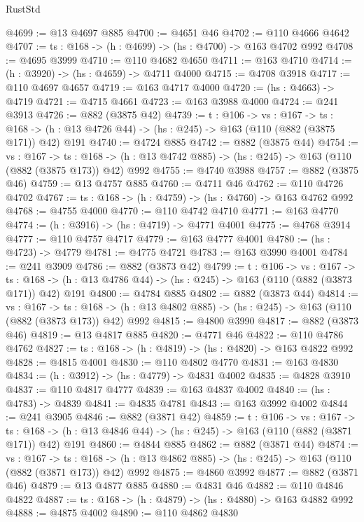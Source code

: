 \begin{lexlean}{RustStd}
\begin{coremodule}
@4699 := @13 @4697 @885
@4700 := @4651 @46
@4702 := @110 @4666 @4642
@4707 := {ts : @168} -> (h : @4699) -> (hs : @4700) -> @163 @4702 @992
@4708 := @4695 @3999
@4710 := @110 @4682 @4650
@4711 := @163 @4710
@4714 := (h : @3920) -> (hs : @4659) -> @4711 @4000
@4715 := @4708 @3918
@4717 := @110 @4697 @4657
@4719 := @163 @4717 @4000
@4720 := (hs : @4663) -> @4719
@4721 := @4715 @4661
@4723 := @163 @3988 @4000
@4724 := @241 @3913
@4726 := @882 (@3875 @42)
@4739 := {t : @106} ->
  {vs : @167} ->
  {ts : @168} -> (h : @13 @4726 @44) -> (hs : @245) -> @163 (@110 (@882 (@3875 @171)) @42) @191
@4740 := @4724 @885
@4742 := @882 (@3875 @44)
@4754 := {vs : @167} ->
  {ts : @168} -> (h : @13 @4742 @885) -> (hs : @245) -> @163 (@110 (@882 (@3875 @173)) @42) @992
@4755 := @4740 @3988
@4757 := @882 (@3875 @46)
@4759 := @13 @4757 @885
@4760 := @4711 @46
@4762 := @110 @4726 @4702
@4767 := {ts : @168} -> (h : @4759) -> (hs : @4760) -> @163 @4762 @992
@4768 := @4755 @4000
@4770 := @110 @4742 @4710
@4771 := @163 @4770
@4774 := (h : @3916) -> (hs : @4719) -> @4771 @4001
@4775 := @4768 @3914
@4777 := @110 @4757 @4717
@4779 := @163 @4777 @4001
@4780 := (hs : @4723) -> @4779
@4781 := @4775 @4721
@4783 := @163 @3990 @4001
@4784 := @241 @3909
@4786 := @882 (@3873 @42)
@4799 := {t : @106} ->
  {vs : @167} ->
  {ts : @168} -> (h : @13 @4786 @44) -> (hs : @245) -> @163 (@110 (@882 (@3873 @171)) @42) @191
@4800 := @4784 @885
@4802 := @882 (@3873 @44)
@4814 := {vs : @167} ->
  {ts : @168} -> (h : @13 @4802 @885) -> (hs : @245) -> @163 (@110 (@882 (@3873 @173)) @42) @992
@4815 := @4800 @3990
@4817 := @882 (@3873 @46)
@4819 := @13 @4817 @885
@4820 := @4771 @46
@4822 := @110 @4786 @4762
@4827 := {ts : @168} -> (h : @4819) -> (hs : @4820) -> @163 @4822 @992
@4828 := @4815 @4001
@4830 := @110 @4802 @4770
@4831 := @163 @4830
@4834 := (h : @3912) -> (hs : @4779) -> @4831 @4002
@4835 := @4828 @3910
@4837 := @110 @4817 @4777
@4839 := @163 @4837 @4002
@4840 := (hs : @4783) -> @4839
@4841 := @4835 @4781
@4843 := @163 @3992 @4002
@4844 := @241 @3905
@4846 := @882 (@3871 @42)
@4859 := {t : @106} ->
  {vs : @167} ->
  {ts : @168} -> (h : @13 @4846 @44) -> (hs : @245) -> @163 (@110 (@882 (@3871 @171)) @42) @191
@4860 := @4844 @885
@4862 := @882 (@3871 @44)
@4874 := {vs : @167} ->
  {ts : @168} -> (h : @13 @4862 @885) -> (hs : @245) -> @163 (@110 (@882 (@3871 @173)) @42) @992
@4875 := @4860 @3992
@4877 := @882 (@3871 @46)
@4879 := @13 @4877 @885
@4880 := @4831 @46
@4882 := @110 @4846 @4822
@4887 := {ts : @168} -> (h : @4879) -> (hs : @4880) -> @163 @4882 @992
@4888 := @4875 @4002
@4890 := @110 @4862 @4830

\end{coremodule}
\end{lexlean}
